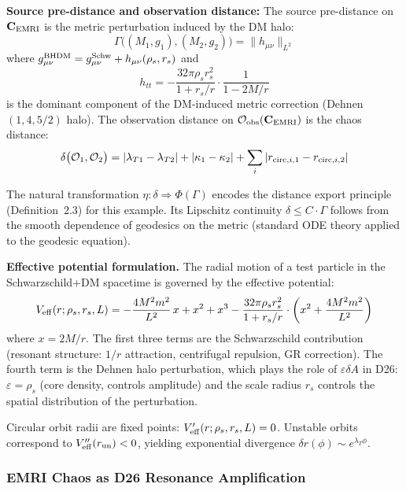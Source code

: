 \documentclass[
]{article}
\begin{document}
\textbf{Source pre-distance and observation distance:} The source pre-distance on $\mathbf{C}_{\rm EMRI}$ is the metric perturbation induced by the DM halo:
\begin{equation}
\Gamma\bigl((M_1, g_1), (M_2, g_2)\bigr) = \|h_{\mu\nu}\|_{L^2}
\end{equation}
where $g_{\mu\nu}^{\rm BHDM} = g_{\mu\nu}^{\rm Schw} + h_{\mu\nu}(\rho_s, r_s)$ and
\begin{equation}
h_{tt} = -\frac{32\pi\rho_s r_s^2}{1 + r_s/r} \cdot \frac{1}{1 - 2M/r}
\end{equation}
is the dominant component of the DM-induced metric correction (Dehnen $(1, 4, 5/2)$ halo). The observation distance on $\mathcal{O}_{\rm obs}(\mathbf{C}_{\rm EMRI})$ is the chaos distance:
\begin{equation}
\delta\bigl(\mathcal{O}_1, \mathcal{O}_2\bigr) = |\lambda_{T1} - \lambda_{T2}| + |\kappa_1 - \kappa_2| + \sum_i |r_{{\rm circ}, i, 1} - r_{{\rm circ}, i, 2}|
\end{equation}

The natural transformation $\eta: \delta \Rightarrow \Phi(\Gamma)$ encodes the distance export principle (Definition~2.3) for this example. Its Lipschitz continuity $\delta \leq C \cdot \Gamma$ follows from the smooth dependence of geodesics on the metric (standard ODE theory applied to the geodesic equation).

\textbf{Effective potential formulation.} The radial motion of a test particle in the Schwarzschild+DM spacetime is governed by the effective potential:
\begin{equation}\label{eq:veff}
V_{\rm eff}(r; \rho_s, r_s, L) = -\frac{4M^2m^2}{L^2}\,x + x^2 + x^3 - \frac{32\pi\rho_s r_s^2}{1 + r_s/r} \cdot \left(x^2 + \frac{4M^2m^2}{L^2}\right)
\end{equation}
where $x = 2M/r$. The first three terms are the Schwarzschild contribution (resonant structure: $1/r$ attraction, centrifugal repulsion, GR correction). The fourth term is the Dehnen halo perturbation, which plays the role of $\varepsilon\delta A$ in D26: $\varepsilon = \rho_s$ (core density, controls amplitude) and the scale radius $r_s$ controls the spatial distribution of the perturbation.

Circular orbit radii are fixed points: $V_{\rm eff}'(r; \rho_s, r_s, L) = 0$. Unstable orbits correspond to $V_{\rm eff}''(r_{\rm un}) < 0$, yielding exponential divergence $\delta r(\phi) \sim e^{\lambda_T \phi}$.

\subsubsection{EMRI Chaos as D26 Resonance Amplification}\label{subsec:emri-resonance}
\end{document}
